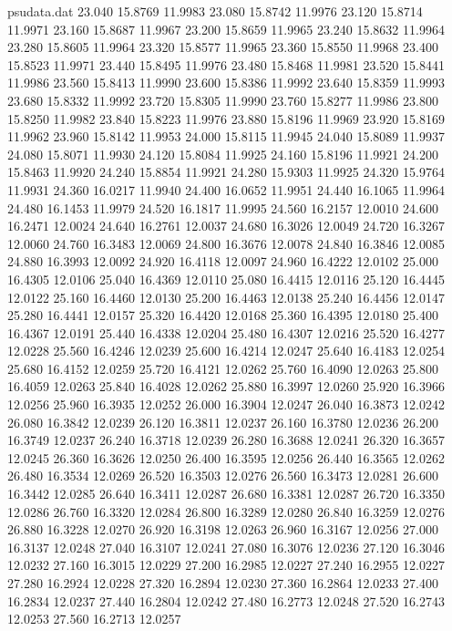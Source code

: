 \begin{filecontents*}{psudata.dat}
23.040 15.8769 11.9983
23.080 15.8742 11.9976
23.120 15.8714 11.9971
23.160 15.8687 11.9967
23.200 15.8659 11.9965
23.240 15.8632 11.9964
23.280 15.8605 11.9964
23.320 15.8577 11.9965
23.360 15.8550 11.9968
23.400 15.8523 11.9971
23.440 15.8495 11.9976
23.480 15.8468 11.9981
23.520 15.8441 11.9986
23.560 15.8413 11.9990
23.600 15.8386 11.9992
23.640 15.8359 11.9993
23.680 15.8332 11.9992
23.720 15.8305 11.9990
23.760 15.8277 11.9986
23.800 15.8250 11.9982
23.840 15.8223 11.9976
23.880 15.8196 11.9969
23.920 15.8169 11.9962
23.960 15.8142 11.9953
24.000 15.8115 11.9945
24.040 15.8089 11.9937
24.080 15.8071 11.9930
24.120 15.8084 11.9925
24.160 15.8196 11.9921
24.200 15.8463 11.9920
24.240 15.8854 11.9921
24.280 15.9303 11.9925
24.320 15.9764 11.9931
24.360 16.0217 11.9940
24.400 16.0652 11.9951
24.440 16.1065 11.9964
24.480 16.1453 11.9979
24.520 16.1817 11.9995
24.560 16.2157 12.0010
24.600 16.2471 12.0024
24.640 16.2761 12.0037
24.680 16.3026 12.0049
24.720 16.3267 12.0060
24.760 16.3483 12.0069
24.800 16.3676 12.0078
24.840 16.3846 12.0085
24.880 16.3993 12.0092
24.920 16.4118 12.0097
24.960 16.4222 12.0102
25.000 16.4305 12.0106
25.040 16.4369 12.0110
25.080 16.4415 12.0116
25.120 16.4445 12.0122
25.160 16.4460 12.0130
25.200 16.4463 12.0138
25.240 16.4456 12.0147
25.280 16.4441 12.0157
25.320 16.4420 12.0168
25.360 16.4395 12.0180
25.400 16.4367 12.0191
25.440 16.4338 12.0204
25.480 16.4307 12.0216
25.520 16.4277 12.0228
25.560 16.4246 12.0239
25.600 16.4214 12.0247
25.640 16.4183 12.0254
25.680 16.4152 12.0259
25.720 16.4121 12.0262
25.760 16.4090 12.0263
25.800 16.4059 12.0263
25.840 16.4028 12.0262
25.880 16.3997 12.0260
25.920 16.3966 12.0256
25.960 16.3935 12.0252
26.000 16.3904 12.0247
26.040 16.3873 12.0242
26.080 16.3842 12.0239
26.120 16.3811 12.0237
26.160 16.3780 12.0236
26.200 16.3749 12.0237
26.240 16.3718 12.0239
26.280 16.3688 12.0241
26.320 16.3657 12.0245
26.360 16.3626 12.0250
26.400 16.3595 12.0256
26.440 16.3565 12.0262
26.480 16.3534 12.0269
26.520 16.3503 12.0276
26.560 16.3473 12.0281
26.600 16.3442 12.0285
26.640 16.3411 12.0287
26.680 16.3381 12.0287
26.720 16.3350 12.0286
26.760 16.3320 12.0284
26.800 16.3289 12.0280
26.840 16.3259 12.0276
26.880 16.3228 12.0270
26.920 16.3198 12.0263
26.960 16.3167 12.0256
27.000 16.3137 12.0248
27.040 16.3107 12.0241
27.080 16.3076 12.0236
27.120 16.3046 12.0232
27.160 16.3015 12.0229
27.200 16.2985 12.0227
27.240 16.2955 12.0227
27.280 16.2924 12.0228
27.320 16.2894 12.0230
27.360 16.2864 12.0233
27.400 16.2834 12.0237
27.440 16.2804 12.0242
27.480 16.2773 12.0248
27.520 16.2743 12.0253
27.560 16.2713 12.0257

\end{filecontents*}
